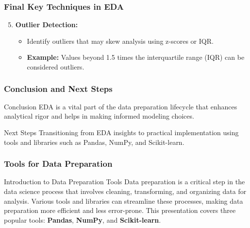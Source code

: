 \documentclass{beamer}
\begin{document}
\begin{frame}[fragile]
    \frametitle{Final Key Techniques in EDA}
    \begin{enumerate}
        \setcounter{enumi}{4} %
        \item \textbf{Outlier Detection:}
            \begin{itemize}
                \item Identify outliers that may skew analysis using z-scores or IQR.
                \item \textbf{Example:} Values beyond 1.5 times the interquartile range (IQR) can be considered outliers.
            \end{itemize}
    \end{enumerate}
\end{frame}

\begin{frame}[fragile]
    \frametitle{Conclusion and Next Steps}
    \begin{block}{Conclusion}
        EDA is a vital part of the data preparation lifecycle that enhances analytical rigor and helps in making informed modeling choices.
    \end{block}

    \begin{block}{Next Steps}
        Transitioning from EDA insights to practical implementation using tools and libraries such as Pandas, NumPy, and Scikit-learn.
    \end{block}
\end{frame}

\begin{frame}
    \frametitle{Tools for Data Preparation}
    \begin{block}{Introduction to Data Preparation Tools}
        Data preparation is a critical step in the data science process that involves cleaning, transforming, and organizing data for analysis. Various tools and libraries can streamline these processes, making data preparation more efficient and less error-prone. This presentation covers three popular tools: \textbf{Pandas}, \textbf{NumPy}, and \textbf{Scikit-learn}.
    \end{block}
\end{frame}
\end{document}
